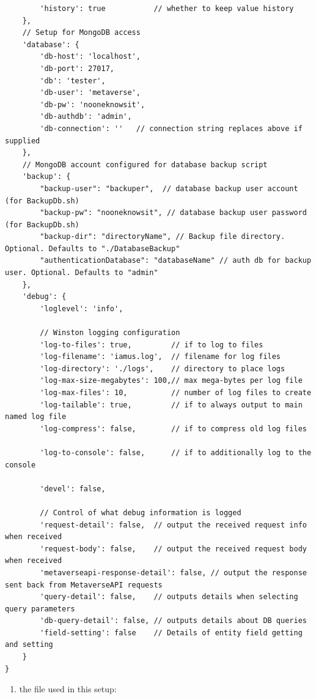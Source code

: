 \begin{verbatim}
        'history': true           // whether to keep value history
    },
    // Setup for MongoDB access
    'database': {
        'db-host': 'localhost',
        'db-port': 27017,
        'db': 'tester',
        'db-user': 'metaverse',
        'db-pw': 'nooneknowsit',
        'db-authdb': 'admin',
        'db-connection': ''   // connection string replaces above if supplied
    },
    // MongoDB account configured for database backup script
    'backup': {
        "backup-user": "backuper",  // database backup user account (for BackupDb.sh)
        "backup-pw": "nooneknowsit", // database backup user password (for BackupDb.sh)
        "backup-dir": "directoryName", // Backup file directory. Optional. Defaults to "./DatabaseBackup"
        "authenticationDatabase": "databaseName" // auth db for backup user. Optional. Defaults to "admin"
    },
    'debug': {
        'loglevel': 'info',

        // Winston logging configuration
        'log-to-files': true,         // if to log to files
        'log-filename': 'iamus.log',  // filename for log files
        'log-directory': './logs',    // directory to place logs
        'log-max-size-megabytes': 100,// max mega-bytes per log file
        'log-max-files': 10,          // number of log files to create
        'log-tailable': true,         // if to always output to main named log file
        'log-compress': false,        // if to compress old log files

        'log-to-console': false,      // if to additionally log to the console

        'devel': false,

        // Control of what debug information is logged
        'request-detail': false,  // output the received request info when received
        'request-body': false,    // output the received request body when received
        'metaverseapi-response-detail': false, // output the response sent back from MetaverseAPI requests
        'query-detail': false,    // outputs details when selecting query parameters
        'db-query-detail': false, // outputs details about DB queries
        'field-setting': false    // Details of entity field getting and setting
    }
}
\end{verbatim}

\begin{enumerate}
\def\labelenumi{\arabic{enumi})}
\setcounter{enumi}{2}

\item
  the file used in this setup:
\end{enumerate}

